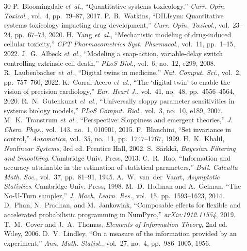 \documentclass[journal]{IEEEtran}
\begin{document}
\begin{thebibliography}{30}
 P.~Bloomingdale \emph{et~al.}, ``Quantitative systems toxicology,'' \emph{Curr. Opin. Toxicol.}, vol.~4, pp.~79--87, 2017.
 P.~B.~Watkins, ``DILIsym: Quantitative systems toxicology impacting drug development,'' \emph{Curr. Opin. Toxicol.}, vol.~23--24, pp.~67--73, 2020.
 H.~Yang \emph{et~al.}, ``Mechanistic modeling of drug-induced cellular toxicity,'' \emph{CPT Pharmacometrics Syst. Pharmacol.}, vol.~11, pp.~1--15, 2022.
 J.~G.~Albeck \emph{et~al.}, ``Modeling a snap-action, variable-delay switch controlling extrinsic cell death,'' \emph{PLoS Biol.}, vol.~6, no.~12, e299, 2008.
 R.~Laubenbacher \emph{et~al.}, ``Digital twins in medicine,'' \emph{Nat. Comput. Sci.}, vol.~2, pp.~757--760, 2022.
 K.~Corral-Acero \emph{et~al.}, ``The `digital twin' to enable the vision of precision cardiology,'' \emph{Eur. Heart J.}, vol.~41, no.~48, pp.~4556--4564, 2020.
 R.~N.~Gutenkunst \emph{et~al.}, ``Universally sloppy parameter sensitivities in systems biology models,'' \emph{PLoS Comput. Biol.}, vol.~3, no.~10, e189, 2007.
 M.~K.~Transtrum \emph{et~al.}, ``Perspective: Sloppiness and emergent theories,'' \emph{J. Chem. Phys.}, vol.~143, no.~1, 010901, 2015.
 F.~Blanchini, ``Set invariance in control,'' \emph{Automatica}, vol.~35, no.~11, pp.~1747--1767, 1999.
 H.~K.~Khalil, \emph{Nonlinear Systems}, 3rd ed. Prentice Hall, 2002.
 S.~S\"arkk\"a, \emph{Bayesian Filtering and Smoothing}. Cambridge Univ. Press, 2013.
 C.~R.~Rao, ``Information and accuracy attainable in the estimation of statistical parameters,'' \emph{Bull. Calcutta Math. Soc.}, vol.~37, pp.~81--91, 1945.
 A.~W.~van~der~Vaart, \emph{Asymptotic Statistics}. Cambridge Univ. Press, 1998.
 M.~D.~Hoffman and A.~Gelman, ``The No-U-Turn sampler,'' \emph{J. Mach. Learn. Res.}, vol.~15, pp.~1593--1623, 2014.
 D.~Phan, N.~Pradhan, and M.~Jankowiak, ``Composable effects for flexible and accelerated probabilistic programming in NumPyro,'' \emph{arXiv:1912.11554}, 2019.
 T.~M.~Cover and J.~A.~Thomas, \emph{Elements of Information Theory}, 2nd ed. Wiley, 2006.
 D.~V.~Lindley, ``On a measure of the information provided by an experiment,'' \emph{Ann. Math. Statist.}, vol.~27, no.~4, pp.~986--1005, 1956.

\end{thebibliography}
\end{document}
